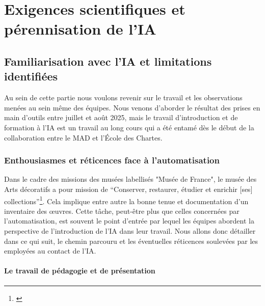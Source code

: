 \part{Exigences scientifiques et pérennisation de l'IA}


\chapter{Familiarisation avec l'IA et limitations identifiées}

Au sein de cette partie nous voulons revenir sur le travail et les observations menées au sein même des équipes. Nous venons d'aborder le résultat des prises en main d'outils entre juillet et août 2025, mais le travail d'introduction et de formation à l'IA est un travail au long cours qui a été entamé dès le début de la collaboration entre le MAD et l'École des Chartes. 

\section{Enthousiasmes et réticences face à l'automatisation}

Dans le cadre des missions des musées labellisés "Musée de France", le musée des Arts décoratifs a pour mission de \enquote{Conserver, restaurer, étudier et enrichir [ses] collections}\footnote{\cite{noauthor_loi_2002}}. Cela implique entre autre la bonne tenue et documentation d'un inventaire des œuvres. Cette tâche, peut-être plus que celles concernées par l'automatisation, est souvent le point d'entrée par lequel les équipes abordent la perspective de l'introduction de l'IA dans leur travail. Nous allons donc détailler dans ce qui suit, le chemin parcouru et les éventuelles réticences soulevées par les employé\wokisme e\wokisme s au contact de l'IA.

\subsection{Le travail de pédagogie et de présentation}

